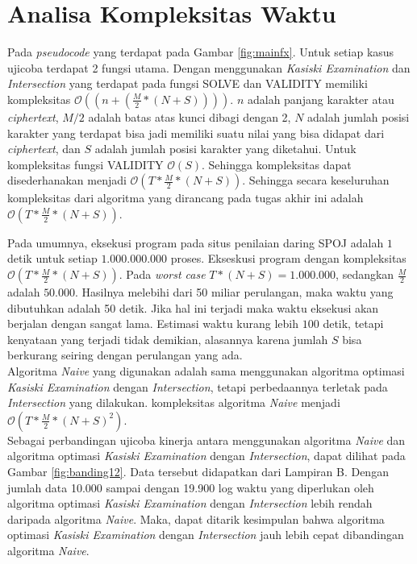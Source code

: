 \section{Analisa Kompleksitas Waktu}
Pada \textit{pseudocode} yang terdapat pada Gambar \ref{fig:mainfx}. Untuk setiap kasus ujicoba terdapat 2 fungsi utama. Dengan menggunakan \textit{Kasiski Examination} dan \textit{Intersection} yang terdapat pada fungsi SOLVE dan VALIDITY memiliki kompleksitas $\mathcal{O}((n+(\frac{M}{2}*(N+S))))$. $n$ adalah panjang karakter \plaintext atau \textit{ciphertext}, $M/2$ adalah batas atas kunci dibagi dengan 2, $N$ adalah jumlah posisi karakter yang terdapat bisa jadi memiliki suatu nilai yang bisa didapat dari \textit{ciphertext}, dan $S$ adalah jumlah posisi karakter yang diketahui. Untuk kompleksitas fungsi VALIDITY $\mathcal{O}(S)$. Sehingga kompleksitas dapat disederhanakan menjadi $\mathcal{O}(T*\frac{M}{2}*(N+S))$.
\indent Sehingga secara keseluruhan kompleksitas dari algoritma yang dirancang pada tugas akhir ini adalah $\mathcal{O}(T*\frac{M}{2}*(N+S))$.

Pada umumnya, eksekusi program pada situs penilaian daring SPOJ adalah $ 1 $ detik untuk setiap $ 1.000.000.000 $ proses. Ekseskusi program dengan kompleksitas $\mathcal{O}(T*\frac{M}{2}*(N+S))$. Pada \textit{worst case} $T*(N+S)=1.000.000$, sedangkan $\frac{M}{2}$ adalah $50.000$. Hasilnya melebihi dari 50 miliar perulangan, maka waktu yang dibutuhkan adalah 50 detik. Jika hal ini terjadi maka waktu eksekusi akan berjalan dengan sangat lama. Estimasi waktu kurang lebih $100$ detik, tetapi kenyataan yang terjadi tidak demikian, alasannya karena jumlah $S$ bisa berkurang seiring dengan perulangan yang ada.
\\
Algoritma \textit{Naive} yang digunakan adalah sama menggunakan algoritma optimasi \textit{Kasiski Examination} dengan \textit{Intersection}, tetapi perbedaannya terletak pada \textit{Intersection} yang dilakukan. kompleksitas algoritma \textit{Naive} menjadi $\mathcal{O}(T*\frac{M}{2}*(N+S)^2)$.
\\
Sebagai perbandingan ujicoba kinerja antara menggunakan algoritma \textit{Naive} dan algoritma optimasi \textit{Kasiski Examination} dengan \textit{Intersection}, dapat dilihat pada Gambar \ref{fig:banding12}. Data tersebut didapatkan dari Lampiran B. Dengan jumlah data 10.000 sampai dengan 19.900 log waktu yang diperlukan oleh algoritma optimasi \textit{Kasiski Examination} dengan \textit{Intersection} lebih rendah daripada algoritma \textit{Naive}. Maka, dapat ditarik kesimpulan bahwa algoritma optimasi \textit{Kasiski Examination} dengan \textit{Intersection} jauh lebih cepat dibandingan algoritma \textit{Naive}. 
	
